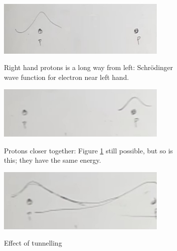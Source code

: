 \documentclass[]{article}
\begin{document}
\begin{figure}[H]
	\caption[Molecular forces: two protons and a single electron]{Two protons and a single electron. Classically electron can't swap between Figures \ref{fig:2proton1Electrona} and \ref{fig:2proton1Electronb}, but QM allows it to tunnel.}\label{fig:2protons:electron}
	\begin{subfigure}{0.45\textwidth}
		\caption{Right hand protons is a long way from left: Schr\"odinger wave function for electron near left hand.} 
		\includegraphics[width=0.9\textwidth]{2proton1Electrona}\label{fig:2proton1Electrona}
	\end{subfigure}
	\begin{subfigure}{0.45\textwidth}
		\caption{Protons closer together: Figure \ref{fig:2proton1Electrona} still possible, but so is this; they have the same energy.}
		\includegraphics[width=0.9\textwidth]{2proton1Electronb}\label{fig:2proton1Electronb}
	\end{subfigure}
	\begin{subfigure}{0.45\textwidth}
		\caption{Effect of tunnelling}
		\includegraphics[width=0.9\textwidth]{2proton1Electronab}\label{fig:2proton1Electronab}
	\end{subfigure}
	\begin{subfigure}{0.45\textwidth}

\end{subfigure}
\end{figure}
\end{document}
